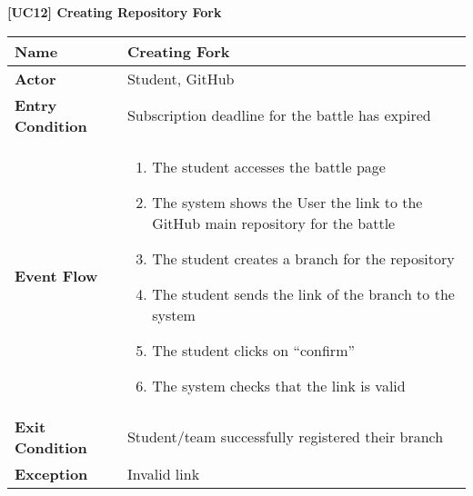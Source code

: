 \documentclass{article}
\begin{document}
\begin{table}
 \renewcommand{\arraystretch}{1.5}
    \centering
    \raggedright\textbf{[UC12] Creating Repository Fork}
    \begin{tabular}{|l|p{10cm}|}
        \hline
        \textbf{Name} & Creating Fork \\
        \hline
        \textbf{Actor} & Student, GitHub \\
        \hline
        \textbf{Entry Condition} & Subscription deadline for the battle has expired\\
        \hline
        \textbf{Event Flow} & 
        \begin{enumerate}[align=left, topsep=0pt, partopsep=0pt]
            \item The student accesses the battle page
            \item The system shows the User the link to the GitHub main repository for the battle
            \item The student creates a branch for the repository  
            \item The student sends the link of the branch to the system
            \item The student clicks on “confirm”
            \item The system checks that the link is valid
        \end{enumerate} \\
        \hline
        \textbf{Exit Condition} & Student/team successfully registered their branch \\
        \hline
        \textbf{Exception} & Invalid link \\
        \hline
    \end{tabular}
\end{table}
\end{document}
